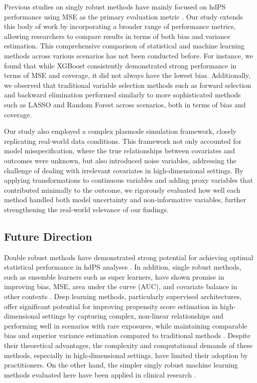 \documentclass[sn-vancouver,Numbered,lineno,pdflatex]{sn-jnl}
\begin{document}
Previous studies on singly robust methods have mainly focused on hdPS
performance using MSE as the primary evaluation metric
\citep{franklin2015regularized, pang2016effect, wyss2018using, karim2018can, simon2023evaluating}.
Our study extends this body of work by incorporating a broader range of
performance metrics, allowing researchers to compare results in terms of
both bias and variance estimation. This comprehensive comparison of
statistical and machine learning methods across various scenarios has
not been conducted before. For instance, we found that while XGBoost
consistently demonstrated strong performance in terms of MSE and
coverage, it did not always have the lowest bias. Additionally, we
observed that traditional variable selection methods such as forward
selection and backward elimination performed similarly to more
sophisticated methods such as LASSO and Random Forest across scenarios,
both in terms of bias and coverage.

Our study also employed a complex plasmode simulation framework, closely
replicating real-world data conditions. This framework not only
accounted for model misspecification, where the true relationships
between covariates and outcomes were unknown, but also introduced noise
variables, addressing the challenge of dealing with irrelevant
covariates in high-dimensional settings. By applying transformations to
continuous variables and adding proxy variables that contributed
minimally to the outcome, we rigorously evaluated how well each method
handled both model uncertainty and non-informative variables, further
strengthening the real-world relevance of our findings.

\subsection{Future Direction}\label{future-direction}

Double robust methods have demonstrated strong potential for achieving
optimal statistical performance in hdPS analyses
\citep{pang2016targeted, pang2016effect, benasseur2022comparison}. In
addition, single robust methods, such as ensemble learners such as super
learners, have shown promise in improving bias, MSE, area under the
curve (AUC), and covariate balance in other contexts
\citep{guertin2016head, wyss2018using, ju2019propensity}. Deep learning
methods, particularly supervised architectures, offer significant
potential for improving propensity score estimation in high-dimensional
settings by capturing complex, non-linear relationships and performing
well in scenarios with rare exposures, while maintaining comparable bias
and superior variance estimation compared to traditional methods
\citep{karim2024can}. Despite their theoretical advantages, the
complexity and computational demands of these methods, especially in
high-dimensional settings, have limited their adoption by practitioners.
On the other hand, the simpler singly robust machine learning methods
evaluated here have been applied in clinical research
\citep{hossain2023role, basham2021post}.
\end{document}
